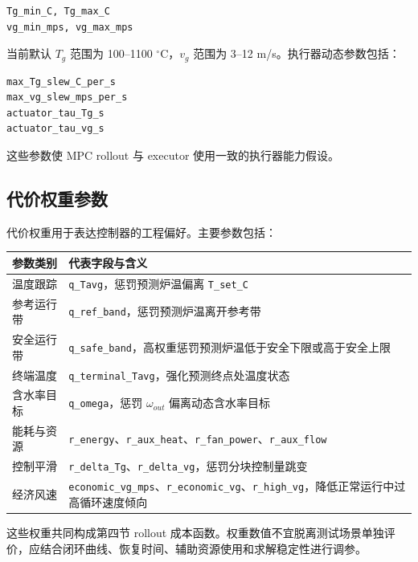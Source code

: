 \documentclass[UTF8,openany,zihao=-4,oneside]{ctexbook}
\providecommand{\passthrough}[1]{#1}
\begin{document}
\begin{lstlisting}
Tg_min_C, Tg_max_C
vg_min_mps, vg_max_mps
\end{lstlisting}

当前默认 \(T_g\) 范围为 100--1100 \(^\circ\mathrm{C}\)，\(v_g\) 范围为 3--12 m/s。执行器动态参数包括：

\begin{lstlisting}
max_Tg_slew_C_per_s
max_vg_slew_mps_per_s
actuator_tau_Tg_s
actuator_tau_vg_s
\end{lstlisting}

这些参数使 MPC rollout 与 executor 使用一致的执行器能力假设。

\subsection{代价权重参数}\label{subsec:nmpc-cost-config}

代价权重用于表达控制器的工程偏好。主要参数包括：

\begin{longtable}[c]{@{}p{}p{}@{}}
\toprule\noalign{}
参数类别 & 代表字段与含义 \\
\midrule\noalign{}
\endhead
\bottomrule\noalign{}
\endlastfoot
温度跟踪 & \passthrough{\lstinline!q_Tavg!}，惩罚预测炉温偏离 \passthrough{\lstinline!T_set_C!} \\
参考运行带 & \passthrough{\lstinline!q_ref_band!}，惩罚预测炉温离开参考带 \\
安全运行带 & \passthrough{\lstinline!q_safe_band!}，高权重惩罚预测炉温低于安全下限或高于安全上限 \\
终端温度 & \passthrough{\lstinline!q_terminal_Tavg!}，强化预测终点处温度状态 \\
含水率目标 & \passthrough{\lstinline!q_omega!}，惩罚 \(\omega_{out}\) 偏离动态含水率目标 \\
能耗与资源 & \passthrough{\lstinline!r_energy!}、\passthrough{\lstinline!r_aux_heat!}、\passthrough{\lstinline!r_fan_power!}、\passthrough{\lstinline!r_aux_flow!} \\
控制平滑 & \passthrough{\lstinline!r_delta_Tg!}、\passthrough{\lstinline!r_delta_vg!}，惩罚分块控制量跳变 \\
经济风速 & \passthrough{\lstinline!economic_vg_mps!}、\passthrough{\lstinline!r_economic_vg!}、\passthrough{\lstinline!r_high_vg!}，降低正常运行中过高循环速度倾向 \\
\end{longtable}

这些权重共同构成第四节 rollout 成本函数。权重数值不宜脱离测试场景单独评价，应结合闭环曲线、恢复时间、辅助资源使用和求解稳定性进行调参。
\end{document}
